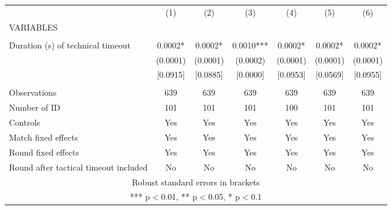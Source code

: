 \documentclass[]{article}
\begin{document}
\begin{tabular}{lcccccc} \hline
 & (1) & (2) & (3) & (4) & (5) & (6) \\
VARIABLES &  &  &  &  &  &  \\ \hline
 &  &  &  &  &  &  \\
Duration (s) of technical timeout & 0.0002* & 0.0002* & 0.0010*** & 0.0002* & 0.0002* & 0.0002* \\
 & (0.0001) & (0.0001) & (0.0002) & (0.0001) & (0.0001) & (0.0001) \\
 & [0.0915] & [0.0885] & [0.0000] & [0.0953] & [0.0569] & [0.0955] \\
 &  &  &  &  &  &  \\
Observations & 639 & 639 & 639 & 639 & 639 & 639 \\
Number of ID & 101 & 101 & 101 & 100 & 101 & 101 \\
Controls & Yes & Yes & Yes & Yes & Yes & Yes \\
Match fixed effects & Yes & Yes & Yes & Yes & Yes & Yes \\
Round fixed effects & Yes & Yes & Yes & Yes & Yes & Yes \\
 Round after tactical timeout included & No & No & No & No & No & No \\ \hline
\multicolumn{7}{c}{ Robust standard errors in brackets} \\
\multicolumn{7}{c}{ *** p$<$0.01, ** p$<$0.05, * p$<$0.1} \\
\end{tabular}
\end{document}
